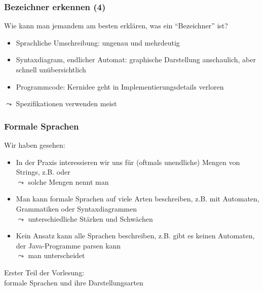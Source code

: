 \documentclass[aspectratio=1610,onlymath]{beamer}
\begin{document}
\begin{frame}\frametitle{Bezeichner erkennen (4)}

Wie kann man jemandem am besten erklären, was ein "`Bezeichner"' ist?
\begin{itemize}
\item \alert{Sprachliche Umschreibung}: ungenau und mehrdeutig
\item \alert{Syntaxdiagram}, \alert{endlicher Automat}: graphische Darstellung anschaulich, aber schnell unübersichtlich
\item \alert{Programmcode}: Kernidee geht in Implementierungsdetails verloren
\end{itemize}
\pause
$\leadsto$ Spezifikationen verwenden meist 


\end{frame}

\begin{frame}\frametitle{Formale Sprachen}

Wir haben gesehen:
\begin{itemize}
\item In der Praxis interessieren wir uns für (oftmals unendliche) Mengen von Strings, z.B.  oder \\
$\leadsto$ solche Mengen nennt man 
\item Man kann formale Sprachen auf viele Arten beschreiben, z.B. mit Automaten, Grammatiken oder Syntaxdiagrammen\\
$\leadsto$ unterschiedliche Stärken und Schwächen
\item Kein Ansatz kann alle Sprachen beschreiben, z.B. gibt es keinen Automaten, der Java-Programme parsen kann\\
$\leadsto$ man unterscheidet 
\end{itemize}

Erster Teil der Vorlesung:\\
formale Sprachen und ihre Darstellungsarten

\end{frame}
\end{document}
